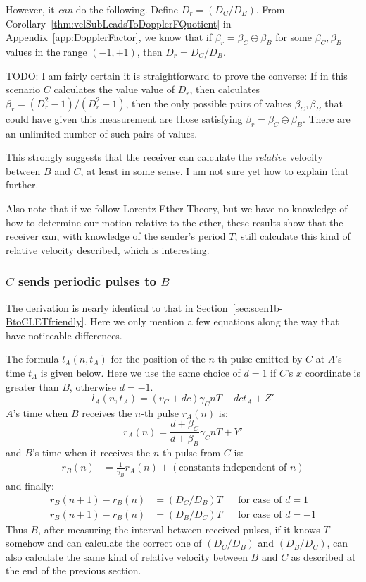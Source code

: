 \documentclass[a4paper]{article}
\theoremstyle{plain}
\theoremstyle{definition}
\begin{document}
However, it {\em can} do the following.  Define $D_r = (D_C / D_B)$.
From Corollary~\ref{thm:velSubLeadsToDopplerFQuotient} in
Appendix~\ref{app:DopplerFactor}, we know that if
$\beta_r = \beta_C \ominus \beta_B$ for some $\beta_C, \beta_B$ values
in the range $(-1, +1)$, then $D_r = D_C / D_B$.

TODO: I am fairly certain it is straightforward to prove the converse:
If in this scenario $C$ calculates the value value of $D_r$, then
calculates $\beta_r = (D_r^2-1)/(D_r^2+1)$, then the only possible
pairs of values $\beta_C, \beta_B$ that could have given this
measurement are those satisfying $\beta_r = \beta_C \ominus \beta_B$.
There are an unlimited number of such pairs of values.

This strongly suggests that the receiver can calculate the
{\em relative} velocity between $B$ and $C$, at least in some sense.
I am not sure yet how to explain that further.

Also note that if we follow Lorentz Ether Theory, but we have no
knowledge of how to determine our motion relative to the ether, these
results show that the receiver can, with knowledge of the sender's
period $T$, still calculate this kind of relative velocity described,
which is interesting.


\subsubsection{$C$ sends periodic pulses to $B$}
\label{sec:scen1b-CtoBLETfriendly}

The derivation is nearly identical to that in
Section~\ref{sec:scen1b-BtoCLETfriendly}.
Here we only mention a few equations along the way that have
noticeable differences.

The formula $l_A(n,t_A)$ for the position of the $n$-th pulse emitted
by $C$ at $A$'s time $t_A$ is given below.
Here we use the same choice of $d=1$ if $C$'s $x$ coordinate is
greater than $B$, otherwise $d=-1$.
\begin{equation}
l_A(n, t_A) = (v_C + dc) \gamma_C nT - dc t_A + Z'
\end{equation}
$A$'s time when $B$ receives the $n$-th pulse $r_A(n)$ is:
\begin{equation}
r_A(n) = \frac{d + \beta_C}{d + \beta_B} \gamma_C nT + Y'
\end{equation}
and $B$'s time when it receives the $n$-th pulse from $C$ is:
\begin{align*}
r_B(n) & = \frac{1}{\gamma_B} r_A(n) + (\text{constants independent of $n$})
\end{align*}
and finally:
\begin{align*}
r_B(n+1) - r_B(n)
       & = ( D_C / D_B ) T & & \text{for case of $d=1$} \\
r_B(n+1) - r_B(n)
       & = ( D_B / D_C ) T & & \text{for case of $d=-1$}
\end{align*}
Thus $B$, after measuring the interval between received pulses, if it
knows $T$ somehow and can calculate the correct one of $(D_C / D_B)$
and $(D_B / D_C)$, can also calculate the same kind of relative
velocity between $B$ and $C$ as described at the end of the previous
section.
\end{document}
